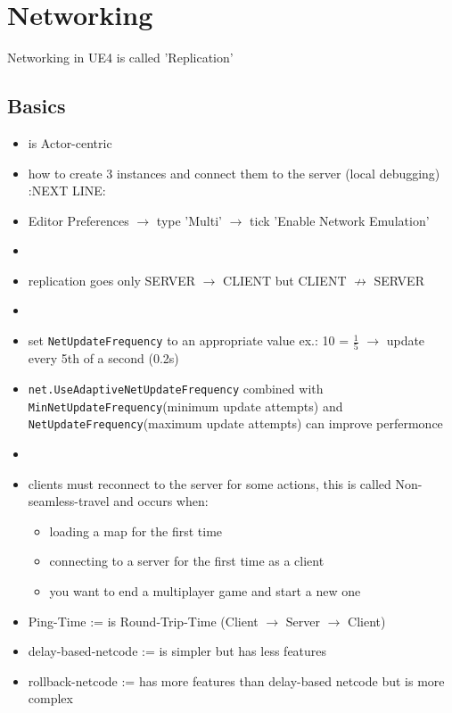 \chapter{Networking}
    Networking in UE4 is called 'Replication'

    \section{Basics}
        \begin{itemize}
            \item is Actor-centric
            \item how to create 3 instances and connect them to the server (local debugging) :NEXT LINE:
            \item Editor Preferences $\rightarrow$ type 'Multi' $\rightarrow$ tick 'Enable Network Emulation'
            \item 
            \item replication goes only SERVER $\rightarrow$ CLIENT but CLIENT $\nrightarrow$ SERVER
            \item 
            \item set \colorbox{mygray}{\lstinline{NetUpdateFrequency}} to an appropriate value ex.: 10 = $\frac{1}{5}$ $\rightarrow$ update every 5th of a second (0.2s)
            \item \colorbox{mygray}{\lstinline{net.UseAdaptiveNetUpdateFrequency}} combined with \colorbox{mygray}{\lstinline{MinNetUpdateFrequency}}(minimum update attempts) and \colorbox{mygray}{\lstinline{NetUpdateFrequency}}(maximum update attempts) can improve perfermonce
            \item 
            \item clients must reconnect to the server for some actions, this is called Non-seamless-travel and occurs when:
            \begin{itemize}
                \item loading a map for the first time
                \item connecting to a server for the first time as a client
                \item you want to end a multiplayer game and start a new one
            \end{itemize}
            \item Ping-Time := is Round-Trip-Time (Client $\rightarrow$ Server $\rightarrow$ Client)
            \item delay-based-netcode := is simpler but has less features
            \item rollback-netcode := has more features than delay-based netcode but is more complex
        \end{itemize}

